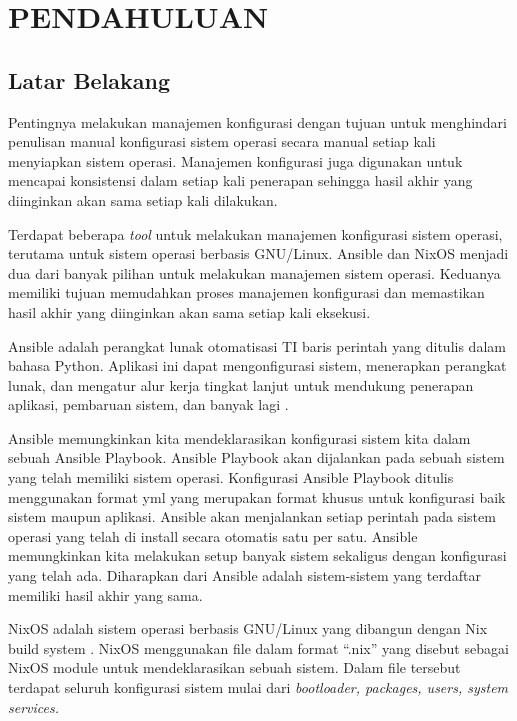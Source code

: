 \documentclass[10pt,]{report}
\begin{document}
\chapter{PENDAHULUAN}
\section{Latar Belakang}
\begin{adjustwidth}{0.70cm}{}
	\vspace{-3mm}
	\hspace\parindent
	Pentingnya melakukan manajemen konfigurasi dengan tujuan untuk menghindari
	penulisan manual konfigurasi sistem operasi secara manual setiap kali
	menyiapkan sistem operasi. Manajemen konfigurasi juga digunakan untuk
	mencapai konsistensi dalam setiap kali penerapan sehingga hasil akhir yang
	diinginkan akan sama setiap kali dilakukan.

  Terdapat beberapa \textit{tool} untuk melakukan manajemen konfigurasi sistem operasi,
	terutama untuk sistem operasi berbasis GNU/Linux. Ansible dan NixOS menjadi
	dua dari banyak pilihan untuk melakukan manajemen sistem operasi. Keduanya
	memiliki tujuan memudahkan proses manajemen konfigurasi dan memastikan hasil
	akhir yang diinginkan akan sama setiap kali eksekusi.

	Ansible adalah perangkat lunak otomatisasi TI baris perintah yang ditulis
	dalam bahasa Python. Aplikasi ini dapat mengonfigurasi sistem, menerapkan
	perangkat lunak, dan mengatur alur kerja tingkat lanjut untuk mendukung
	penerapan aplikasi, pembaruan sistem, dan banyak lagi \parencite{AnsibleRedHat}.

	Ansible memungkinkan kita mendeklarasikan konfigurasi sistem kita dalam
	sebuah Ansible Playbook. Ansible Playbook akan dijalankan pada sebuah sistem
	yang telah memiliki sistem operasi. Konfigurasi Ansible Playbook ditulis
	menggunakan format yml yang merupakan format khusus untuk konfigurasi baik
	sistem maupun aplikasi. Ansible akan menjalankan setiap perintah pada sistem
	operasi yang telah di install secara otomatis satu per satu. Ansible
	memungkinkan kita melakukan setup banyak sistem sekaligus dengan konfigurasi
	yang telah ada. Diharapkan dari Ansible adalah sistem-sistem yang terdaftar
	memiliki hasil akhir yang sama.

	NixOS adalah sistem operasi berbasis GNU/Linux yang dibangun dengan Nix build
	system \parencite{hownixworks} . NixOS menggunakan file dalam format “.nix” yang disebut sebagai NixOS
	module untuk mendeklarasikan sebuah sistem. Dalam file tersebut terdapat
	seluruh konfigurasi sistem mulai dari \textit{bootloader, packages, users, system services.}


\end{adjustwidth}
\end{document}
